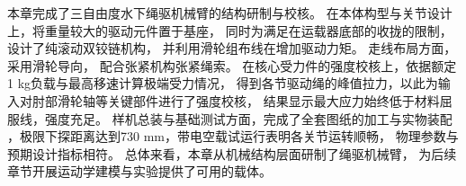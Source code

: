     本章完成了三自由度水下绳驱机械臂的结构研制与校核。
    在本体构型与关节设计上，将重量较大的驱动元件置于基座，
    同时为满足在运载器底部的收拢的限制，设计了纯滚动双铰链机构，
    并利用滑轮组布线在增加驱动力矩。
    走线布局方面，采用滑轮导向，
    配合张紧机构张紧绳索。
    在核心受力件的强度校核上，依据额定1 kg负载与最高移速计算极端受力情况，
    得到各节驱动绳的峰值拉力，以此为输入对肘部滑轮轴等关键部件进行了强度校核，
    结果显示最大应力始终低于材料屈服线，强度充足。
    样机总装与基础测试方面，完成了全套图纸的加工与实物装配
    ，极限下探距离达到730 mm，带电空载试运行表明各关节运转顺畅，
    物理参数与预期设计指标相符。
    总体来看，本章从机械结构层面研制了绳驱机械臂，
    为后续章节开展运动学建模与实验提供了可用的载体。
    \clearpage{
        \pagestyle{plain}
        \cleardoublepage
      }

